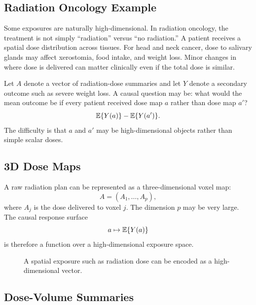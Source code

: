 \label{lec:9-2}

\subsection{Radiation Oncology Example}

Some exposures are naturally high-dimensional. In radiation oncology, the
treatment is not simply ``radiation'' versus ``no radiation.'' A patient receives
a spatial dose distribution across tissues. For head and neck cancer, dose to
salivary glands may affect xerostomia, food intake, and weight loss. Minor
changes in where dose is delivered can matter clinically even if the total dose
is similar.

Let $A$ denote a vector of radiation-dose summaries and let $Y$ denote a
secondary outcome such as severe weight loss. A causal question may be:
what would the mean outcome be if every patient received dose map $a$ rather
than dose map $a'$?
\[
  \mathbb{E}\{Y(a)\}-\mathbb{E}\{Y(a')\}.
\]
The difficulty is that $a$ and $a'$ may be high-dimensional objects rather than
simple scalar doses.

\subsection{3D Dose Maps}

A raw radiation plan can be represented as a three-dimensional voxel map:
\[
  A=(A_1,\ldots,A_p),
\]
where $A_j$ is the dose delivered to voxel $j$. The dimension $p$ may be very
large. The causal response surface
\[
  a\mapsto \mathbb{E}\{Y(a)\}
\]
is therefore a function over a high-dimensional exposure space.

\begin{figure}[H]
\centering
{}
\caption{A spatial exposure such as radiation dose can be encoded as a high-dimensional vector.}
\label{fig:ch9-dose-map}
\end{figure}

\subsection{Dose-Volume Summaries}

